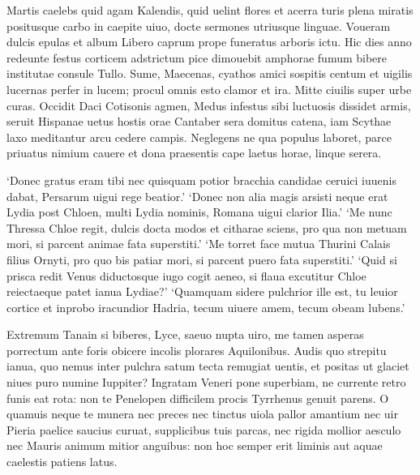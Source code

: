 \documentclass{book}
\newenvironment {carmen} [1] [\relax] 
  {\Titulus \Versus \incipit*\numerus{1}#1}
  {\endVersus}
\newcommand {\Sapphic}   {\Forma \strophae {0 \poena 00 \poena 1}}
\newcommand {\AsclA}     {\Forma \strophae {0 \poena 00 \poena 2}}
\newcommand {\GlycAscl}  {\Forma \strophae {2 \poena 0}}
\begin{document}
\begin{carmen}[\Sapphic]


Martis caelebs quid agam Kalendis,
 quid uelint flores et acerra turis
 plena miratis positusque carbo in
      caepite uiuo, 
docte sermones utriusque linguae.               
 Voueram dulcis epulas et album
 Libero caprum prope funeratus
      arboris ictu. 
Hic dies anno redeunte festus
 corticem adstrictum pice dimouebit               
 amphorae fumum bibere institutae
      consule Tullo. 
Sume, Maecenas, cyathos amici
 sospitis centum et uigilis lucernas
 perfer in lucem; procul omnis esto               
      clamor et ira. 
Mitte ciuilis super urbe curas.
 Occidit Daci Cotisonis agmen,
 Medus infestus sibi luctuosis
      dissidet armis,                
seruit Hispanae uetus hostis orae
 Cantaber sera domitus catena,
 iam Scythae laxo meditantur arcu
      cedere campis. 
Neglegens ne qua populus laboret,               
 parce priuatus nimium cauere et
 dona praesentis cape laetus horae,
      linque serera. 

\end{carmen}

\begin{carmen}[\GlycAscl]


     `Donec gratus eram tibi
 nec quisquam potior bracchia candidae
      ceruici iuuenis dabat,
 Persarum uigui rege beatior.'
      `Donec non alia magis               
 arsisti neque erat Lydia post Chloen,
      multi Lydia nominis,
 Romana uigui clarior Ilia.'
      `Me nunc Thressa Chloe regit,
 dulcis docta modos et citharae sciens,               
      pro qua non metuam mori,
 si parcent animae fata superstiti.'
      `Me torret face mutua
 Thurini Calais filius Ornyti,
      pro quo bis patiar mori,               
 si parcent puero fata superstiti.'
      `Quid si prisca redit Venus
 diductosque iugo cogit aeneo,
      si flaua excutitur Chloe
 reiectaeque patet ianua Lydiae?'               
      `Quamquam sidere pulchrior
 ille est, tu leuior cortice et inprobo
      iracundior Hadria,
 tecum uiuere amem, tecum obeam lubens.' 

\end{carmen}

\begin{carmen}[\AsclA]


Extremum Tanain si biberes, Lyce,
 saeuo nupta uiro, me tamen asperas
 porrectum ante foris obicere incolis
      plorares Aquilonibus. 
Audis quo strepitu ianua, quo nemus               
 inter pulchra satum tecta remugiat
 uentis, et positas ut glaciet niues
      puro numine Iuppiter? 
Ingratam Veneri pone superbiam,
 ne currente retro funis eat rota:               
 non te Penelopen difficilem procis
      Tyrrhenus genuit parens. 
O quamuis neque te munera nec preces
 nec tinctus uiola pallor amantium
 nec uir Pieria paelice saucius               
      curuat, supplicibus tuis 
parcas, nec rigida mollior aesculo
 nec Mauris animum mitior anguibus:
 non hoc semper erit liminis aut aquae
      caelestis patiens latus.                

\end{carmen}
\end{document}
